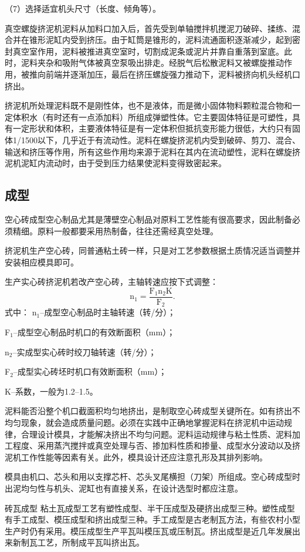 \documentclass{ctexbook}
\begin{document}
（7）选择适宜机头尺寸（长度、倾角等）。

真空螺旋挤泥机泥料从加料口加入后，首先受到单轴搅拌机搅泥刀破碎、揉练、混合并在锥形泥缸内受到挤压。由于缸筒是锥形的，泥料流通面积逐渐减少，起到密封真空室作用，泥料被推进真空室时，切割成泥条或泥片并靠自重落到室底。此时，泥料夹杂和吸附气体被真空泵吸出排走。经脱气后松散泥料又被螺旋推动作用，被推向前端并逐渐加压，最后在挤压螺旋强力推动下，泥料被挤向机头经机口挤出。

挤泥机所处理泥料既不是刚性体，也不是液体，而是微小固体物料颗粒混合物和一定体积水（有时还有一点添加料）所组成弹塑性体。它主要固体特征是可塑性，具有一定形状和体积，主要液体特征是有一定体积但抵抗变形能力很低，大约只有固体1/1500以下，几乎近于有流动性。泥料在螺旋挤泥机内受到破碎、剪刀、混合、输送和挤压等作用，所有这些作用均来源于泥料在其内在流动塑性，泥料在螺旋挤泥机泥缸内流动时，由于受到压力结果使泥料变得致密起来。
\subsection{成型}
空心砖成型空心制品尤其是薄壁空心制品对原料工艺性能有很高要求，因此制备必须精细。原料一般都要采用热制备，往往还需经真空处理。

挤泥机生产空心砖，同普通粘土砖一样，只是对工艺参数根据土质情况适当调整并安装相应模具即可。

生产实心砖挤泥机若改产空心砖，主轴转速应按下式调整：
\begin{equation*}
	\text{n$_1$}=\frac{\text{F$_{1}$}\text{n$_2$}\text{K}}{\text{F$_2$}}.
\end{equation*}
式中：
n$_1$--成型空心制品时主轴转速（转/分）；

F$_1$--成型空心制品时机口的有效断面积（mm）；

n$_2$--实成型实心砖时绞刀轴转速（转/分）；

F$_2$--成型实心砖坯时机口有效断面积（mm）；

K--系数，一般为1.2--1.5。

泥料能否沿整个机口截面积均匀地挤出，是制取空心砖成型关键所在。如有挤出不均匀现象，就会造成质量问题。必须在实践中正确地掌握泥料在挤泥机中运动规律，合理设计模具，才能解决挤出不均匀问题。泥料运动规律与粘土性质、泥料加工程度、采用蒸汽搅拌或真空处理与否、掺加料性质和掺量、成型水分波动以及挤泥机工作性能等因素有关。此外，模具设计还应注意孔形及其排列影响。

模具由机口、芯头和用以支撑芯杆、芯头叉尾横担（刀架）所组成。空心砖成型时出泥均匀性与机头、泥缸也有直接关系，在设计选型时都应注意。

砖瓦成型 粘土瓦成型工艺有塑性成型、半干压成型及硬挤出成型三种。塑性成型有手工成型、模压成型和挤出成型三种。手工成型是古老制瓦方法，有些农村小型生产时仍有采用。模压成型生产平瓦叫模压瓦或压制瓦。挤出成型是近几年发展出来新制瓦工艺，所制成平瓦叫挤出瓦。
\end{document}
